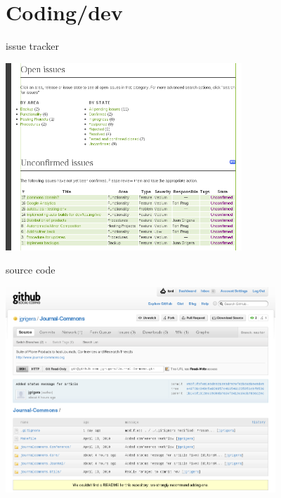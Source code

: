 \section{Coding/dev}
\begin{frame}{issue tracker}{}
 \begin{center}
\includegraphics[width=3.5in]{10-tracker.png}
\end{center}
\end{frame}

\begin{frame}{source code}{}
 \begin{center}
\includegraphics[width=4in]{11-github.png}
\end{center}
\end{frame}


